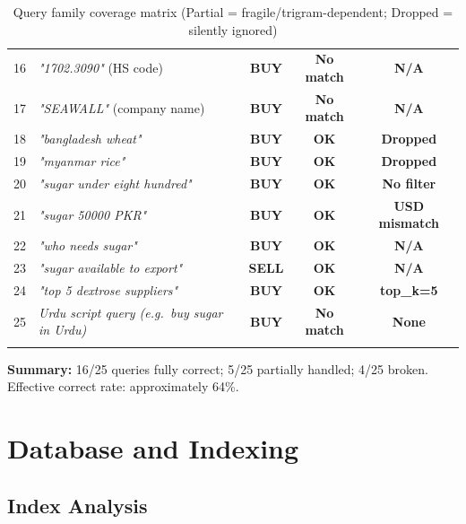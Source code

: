 \documentclass[12pt,a4paper]{article}
\newcommand{\cellOK}[1]{\cellcolor{okBg}\textcolor{zaraiGreen}{\textbf{#1}}}
\newcommand{\cellWarn}[1]{\cellcolor{warningBg}\textcolor{zaraiAmber}{\textbf{#1}}}
\newcommand{\cellBad}[1]{\cellcolor{errorBg}\textcolor{zaraiRed}{\textbf{#1}}}
\begin{document}
\begin{longtable}{lp{5cm}ccc}
16 & \textit{"1702.3090"} (HS code) & \cellOK{BUY} & \cellBad{No match} & \cellOK{N/A} \\
17 & \textit{"SEAWALL"} (company name) & \cellOK{BUY} & \cellBad{No match} & \cellOK{N/A} \\
18 & \textit{"bangladesh wheat"} & \cellOK{BUY} & \cellOK{OK} & \cellBad{Dropped} \\
19 & \textit{"myanmar rice"} & \cellOK{BUY} & \cellOK{OK} & \cellBad{Dropped} \\
20 & \textit{"sugar under eight hundred"} & \cellOK{BUY} & \cellOK{OK} & \cellBad{No filter} \\
21 & \textit{"sugar 50000 PKR"} & \cellOK{BUY} & \cellOK{OK} & \cellBad{USD mismatch} \\
22 & \textit{"who needs sugar"} & \cellOK{BUY} & \cellOK{OK} & \cellOK{N/A} \\
23 & \textit{"sugar available to export"} & \cellOK{SELL} & \cellOK{OK} & \cellOK{N/A} \\
24 & \textit{"top 5 dextrose suppliers"} & \cellOK{BUY} & \cellOK{OK} & \cellOK{top\_k=5} \\
25 & \textit{Urdu script query (e.g.\ buy sugar in Urdu)} & \cellWarn{BUY} & \cellBad{No match} & \cellBad{None} \\
\bottomrule
\caption{Query family coverage matrix (Partial = fragile/trigram-dependent; Dropped = silently ignored)}
\end{longtable}

\textbf{Summary:} 16/25 queries fully correct; 5/25 partially handled; 4/25 broken.
Effective correct rate: approximately 64\%.

\section{Database and Indexing}

\subsection{Index Analysis}
\end{document}
